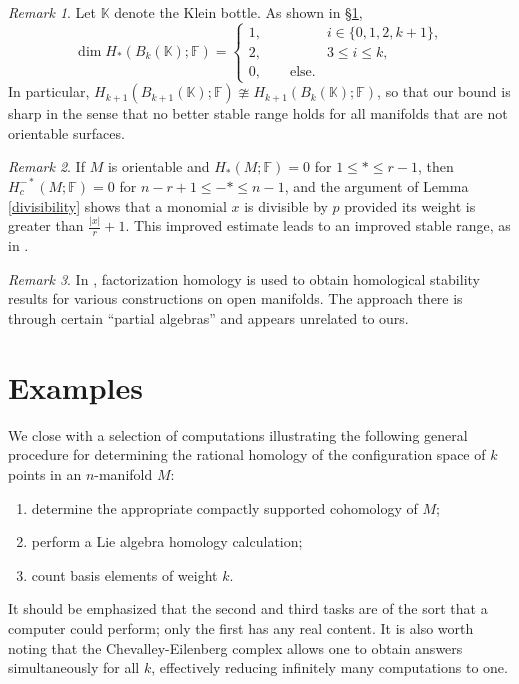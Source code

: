 \documentclass{compositio}
\theoremstyle{definition}\newtheorem{definition}{Definition}[section]
\theoremstyle{theorem}\newtheorem{lemma}[definition]{Lemma}
\theoremstyle{remark}\newtheorem*{conventions}{Conventions}
\theoremstyle{remark}\newtheorem*{acknowledgments}{Acknowledgments}
\theoremstyle{remark}\newtheorem*{outline}{Outline}
\theoremstyle{remark}\newtheorem*{questions}{Questions}
\theoremstyle{remark}\newtheorem{example}[definition]{Example}
\theoremstyle{definition}\newtheorem{construction}[definition]{Construction}
\theoremstyle{definition}\newtheorem*{convention}{Convention}
\theoremstyle{definition}\newtheorem*{conjecture}{Conjecture}
\theoremstyle{theorem}\newtheorem{theorem}[definition]{Theorem}
\theoremstyle{theorem}\newtheorem{paradigm}[definition]{Paradigm}
\theoremstyle{remark}\newtheorem{remark}[definition]{Remark}
\theoremstyle{corollary}\newtheorem{corollary}[definition]{Corollary}
\theoremstyle{theorem}\newtheorem{proposition}[definition]{Proposition}
\theoremstyle{definition}\newtheorem{question}[definition]{Question}
\begin{document}
\begin{remark}
Let $\mathbb{K}$ denote the Klein bottle. As shown in \S\ref{examples}, $$\dim H_*(B_k(\mathbb{K});\mathbb{F})=\begin{cases}
1,\qquad &i\in\{0,1,2, k+1\},\\
2,\qquad &3\leq i\leq k,\\
0,\qquad \text{else.}
\end{cases}$$ In particular, $H_{k+1}(B_{k+1}(\mathbb{K});\mathbb{F})\ncong H_{k+1}(B_{k}(\mathbb{K});\mathbb{F})$, so that our bound is sharp in the sense that no better stable range holds for all manifolds that are not orientable surfaces.
\end{remark}

\begin{remark}
If $M$ is orientable and $H_*(M;\mathbb{F})=0$ for $1\leq *\leq r-1$, then $H_c^{-*}(M;\mathbb{F})=0$ for $n-r+1\leq -*\leq n-1$, and the argument of Lemma \ref{divisibility} shows that a monomial $x$ is divisible by $p$ provided its weight is greater than $\frac{|x|}{r}+1$. This improved estimate leads to an improved stable range, as in \cite{Church}.
\end{remark}

\begin{remark}
In \cite{MillerKupers}, factorization homology is used to obtain homological stability results for various constructions on open manifolds. The approach there is through certain ``partial algebras'' and appears unrelated to ours.
\end{remark}

\section{Examples}\label{examples}

We close with a selection of computations illustrating the following general procedure for determining the rational homology of the configuration space of $k$ points in an $n$-manifold $M$:

\begin{enumerate}
\item determine the appropriate compactly supported cohomology of $M$;
\item perform a Lie algebra homology calculation;
\item count basis elements of weight $k$.
\end{enumerate}

\noindent It should be emphasized that the second and third tasks are of the sort that a computer could perform; only the first has any real content. It is also worth noting that the Chevalley-Eilenberg complex allows one to obtain answers simultaneously for all $k$, effectively reducing infinitely many computations to one.
\end{document}
